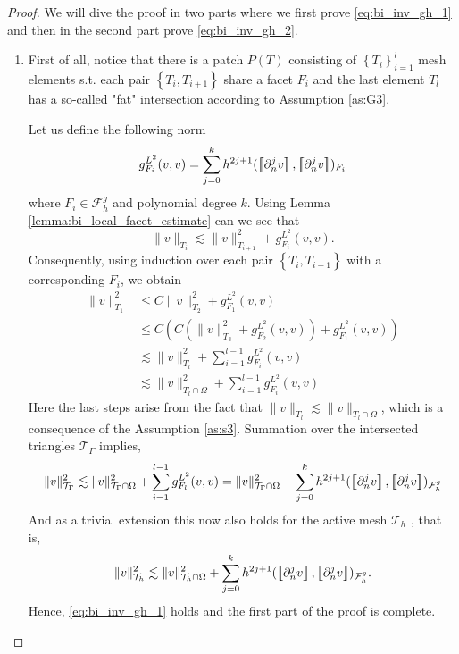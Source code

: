 \begin{proof}
    We will dive the proof in two parts where we first prove \eqref{eq:bi_inv_gh_1} and then in the second part prove \eqref{eq:bi_inv_gh_2}.
    \begin{enumerate}[label=\arabic*)]
        \item
            First of all, notice that there is a patch $P(T) $ consisting of $\left\{ T_{i} \right\}_{i=1}^{l} $ mesh elements s.t. each pair $ \left\{ T_{i}, T_{i+1} \right\} $ share a facet $F_{i}$ and the last element $T_{l}$ has a so-called "fat"
            intersection according to Assumption \ref{as:G3}.

            Let us define the following norm \[
            g_{F_{i}}^{L^{2}}( v,v)  = \sum_{j=0}^{k} h^{2j+1}( \jump{ \partial ^{j}_{n}v }, \jump{ \partial ^{j}_{n}v }    )_{F_{i} }
            \]
            where $F_{i} \in  \mathcal{F} ^{g}_{h}$ and polynomial degree $ k$. Using Lemma \ref{lemma:bi_local_facet_estimate} can we see that \[
            \| v \|_{ T_{i} }^{  } \lesssim \| v \|_{ T_{i+1} }^{ 2 } + g_{F_{i}}^{L^{2}}( v,v).
            \]
    Consequently, using induction over each pair $\left\{ T_{i}, T_{i+1} \right\} $ with a corresponding $F_{i}$, we obtain
            \[
                \begin{split}
            \| v \|_{ T_{1} }^{2  }  & \le  C \| v \|_{ T_{2} }^{ 2 } + g_{F_{1}}^{L^{2}}( v,v)\\
              & \le  C( C( \| v \|_{ T_{3} }^{ 2 } + g_{F_{2}}^{L^{2}}( v,v) ) + g_{F_{1}}^{L^{2}}( v,v) )\\
              & \lesssim    \| v \|_{ T_{l} }^{ 2 }  + \sum_{i=1}^{l-1} g_{F_{i}}^{L^{2}}( v,v)  \\
              & \lesssim    \| v \|_{ T_{l} \cap \Omega  }^{ 2 }  + \sum_{i=1}^{l-1} g_{F_{i}}^{L^{2}}( v,v)
                \end{split}
            \]
            Here the last steps arise from the fact that $\|  v \|_{ T_{l} }^{  } \lesssim  \|  v \|_{ T_{l} \cap \Omega  }^{  }  $, which is a consequence of the Assumption \ref{as:s3}.
Summation over the intersected triangles $\mathcal{T} _{\Gamma }$ implies,
            \[
                    \| v \|_{ \mathcal{T} _{\Gamma } }^{2  } \lesssim \| v \|_{ \mathcal{T} _{\Gamma}\cap \Omega  }^{2  }+ \sum_{i=1}^{l-1} g_{F_{l}}^{L^{2}}( v,v) \\
                     = \| v \|_{ \mathcal{T}_{\Gamma } \cap \Omega   }^{ 2 }  + \sum_{j=0}^{k} h^{2j+1} ( \jump{ \partial ^{j}_{n} v }, \jump{ \partial ^{j}_{n}v }    )_{\mathcal{F}_{h}^{g}}
        \]
        And as a trivial extension this now also holds for the active mesh $\mathcal{T} _{h}$ , that is, \[
                    \| v \|_{ \mathcal{T} _{h } }^{2  } \lesssim  \| v \|_{ \mathcal{T}_{h } \cap \Omega   }^{ 2 }  + \sum_{j=0}^{k} h^{2j+1} ( \jump{ \partial ^{j}_{n} v }, \jump{ \partial ^{j}_{n}v }    )_{\mathcal{F}_{h}^{g}}.
        \]
        Hence, \eqref{eq:bi_inv_gh_1} holds and the first part of the proof is complete.


\end{enumerate}
\end{proof}
